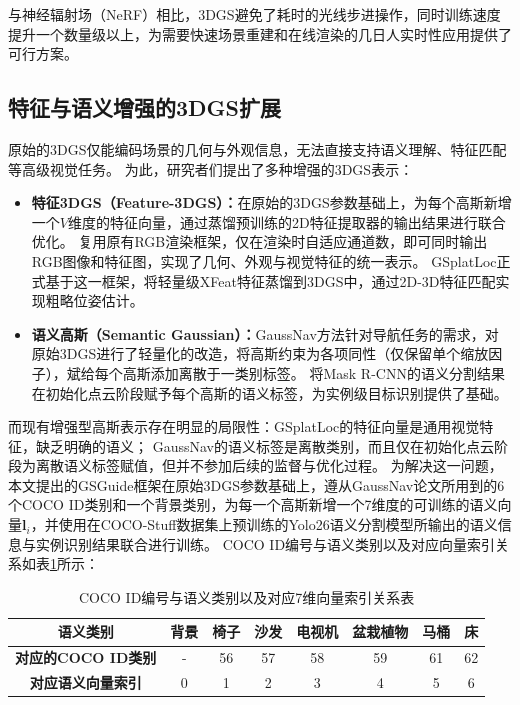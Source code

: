 与神经辐射场（NeRF）\cite{nerf}相比，3DGS\cite{3DGS}避免了耗时的光线步进操作，同时训练速度提升一个数量级以上，为需要快速场景重建和在线渲染的几日人实时性应用提供了可行方案。

\subsection{特征与语义增强的3DGS扩展}
原始的3DGS仅能编码场景的几何与外观信息，无法直接支持语义理解、特征匹配等高级视觉任务。
为此，研究者们提出了多种增强的3DGS表示：

\begin{itemize}
    \item \textbf{特征3DGS（Feature-3DGS）：}在原始的3DGS参数基础上，为每个高斯新增一个$V$维度的特征向量，通过蒸馏预训练的2D特征提取器的输出结果进行联合优化。
    复用原有RGB渲染框架，仅在渲染时自适应通道数，即可同时输出RGB图像和特征图，实现了几何、外观与视觉特征的统一表示。
    GSplatLoc\cite{gsplatloc}正式基于这一框架，将轻量级XFeat\cite{xfeat}特征蒸馏到3DGS\cite{3DGS}中，通过2D-3D特征匹配实现粗略位姿估计。

    \item \textbf{语义高斯（Semantic Gaussian）：}GaussNav\cite{gaussnav}方法针对导航任务的需求，对原始3DGS\cite{3DGS}进行了轻量化的改造，将高斯约束为各项同性（仅保留单个缩放因子），斌给每个高斯添加离散于一类别标签。
    将Mask R-CNN\cite{maskrcnn}的语义分割结果在初始化点云阶段赋予每个高斯的语义标签，为实例级目标识别提供了基础。
\end{itemize}

而现有增强型高斯表示存在明显的局限性：GSplatLoc\cite{gsplatloc}的特征向量是通用视觉特征，缺乏明确的语义；
GaussNav\cite{gaussnav}的语义标签是离散类别，而且仅在初始化点云阶段为离散语义标签赋值，但并不参加后续的监督与优化过程。
为解决这一问题，本文提出的GSGuide框架在原始3DGS\cite{3DGS}参数基础上，遵从GaussNav\cite{gaussnav}\cite{gaussnav}论文所用到的6个COCO ID\cite{coco}类别和一个背景类别，为每一个高斯新增一个7维度的可训练的语义向量$\boldsymbol{l}_i$，并使用在COCO-Stuff\cite{coco-stuff}数据集上预训练的Yolo26\cite{Yolo26}语义分割模型所输出的语义信息与实例识别结果联合进行训练。
COCO ID编号与语义类别以及对应向量索引关系如表\ref{tab:cocoid对应关系表}所示：
\begin{table}[htbp]
    \centering
    \caption{COCO ID编号与语义类别以及对应7维向量索引关系表}
    \begin{tabular}{cccccccc}
        \toprule
        \textbf{语义类别} & 背景 & 椅子 & 沙发 & 电视机 & 盆栽植物 & 马桶 & 床 \\
        \midrule
        \textbf{对应的COCO ID类别} & - & 56 & 57 & 58 & 59 & 61 & 62 \\
        \textbf{对应语义向量索引} & 0 & 1 & 2 & 3 & 4 & 5 & 6 \\
        \bottomrule
    \end{tabular}
    \vspace{0.5em}  %
    \label{tab:cocoid对应关系表}
\end{table}


